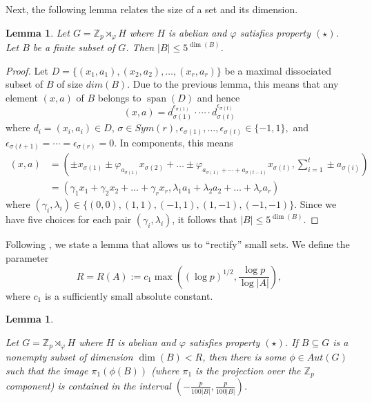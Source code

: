 \documentclass[11pt]{amsart}
\newtheorem{lemma}[theorem]{Lemma}
\theoremstyle{definition}
\DeclareMathOperator{\Span}{span}
\begin{document}
Next, the following lemma relates the size of a set and its dimension.
\begin{lemma}\label{lem:dimension-cardinality2}
Let $G=\mathbb{Z}_{p} \rtimes_{\varphi} H$ where $H$ is abelian and $\varphi$ satisfies property $(\star)$. Let $B$ be a finite subset of $G$. Then
$|B| \leq 5^{\dim(B)}$.
\end{lemma}
\begin{proof}
Let $D=\{(x_1,a_1),(x_2,a_2),\dots,(x_r,a_r)\}$ be a maximal dissociated subset of $B$ of size $dim(B)$. Due to the previous lemma, this means that any element $(x,a)$ of $B$ belongs to $\Span(D)$ and hence
$$(x,a)=d_{\sigma(1)}^{\epsilon_{\sigma(1)}} \cdot \cdots \cdot d_{\sigma(t)}^ {\epsilon_{\sigma(t)}}$$ where $d_i = (x_i,a_i) \in D$, $\sigma \in Sym(r), \epsilon_{\sigma(1)},\dots, \epsilon_{\sigma(t)}\in\{-1,1\},$ and $\epsilon_{\sigma(t+1)}=\cdots=\epsilon_{\sigma(r)}=0.$
In components, this means
\begin{align*}(x,a)&=\left(\pm x_{\sigma(1)}\pm \varphi_{a_{\sigma(1)}}x_{\sigma(2)}+\dots\pm\varphi_{a_{\sigma(1)}+\cdots+a_{\sigma(t-1)}}x_{\sigma(t)},\sum_{i=1}^t \pm a_{\sigma(i)}\right) \\
&= \left(\gamma_1 x_{1}+\gamma_2 x_{2}+\dots+\gamma_r x_r,\lambda_1 a_{1}+\lambda_2 a_{2}+\dots+\lambda_r a_r\right)
\end{align*}
where $(\gamma_i,\lambda_i)\in \{(0,0),(1,1),(-1,1),(1,-1),(-1,-1)\}$. Since we have five choices for each pair $(\gamma_i,\lambda_i)$, it follows that $|B| \leq 5^{\dim(B)}$.
\end{proof}

Following \cite{BK}, we state a lemma that allows us to ``rectify'' small sets. We define the parameter
\begin{equation}%
R=R(A):=c_1\max\left((\log p)^{1/2},\frac{\log p}{\log |A|}\right),
 \end{equation}
where $c_1$ is a sufficiently small absolute constant.

\begin{lemma}\label{lem:small-dim-recitification}

Let $G=\mathbb{Z}_{p} \rtimes_{\varphi} H$ where $H$ is abelian and $\varphi$ satisfies property $(\star)$. If $B \subseteq G$ is a nonempty subset of dimension $\dim(B)< R$, then there is some $\phi \in Aut(G)$ such that the image $\pi_1(\phi(B))$ (where $\pi_1$ is the projection over the $\mathbb{Z}_p$ component) is contained in the interval $(-\frac{p}{100|B|},\frac{p}{100|B|})$.
\end{lemma}
\end{document}
